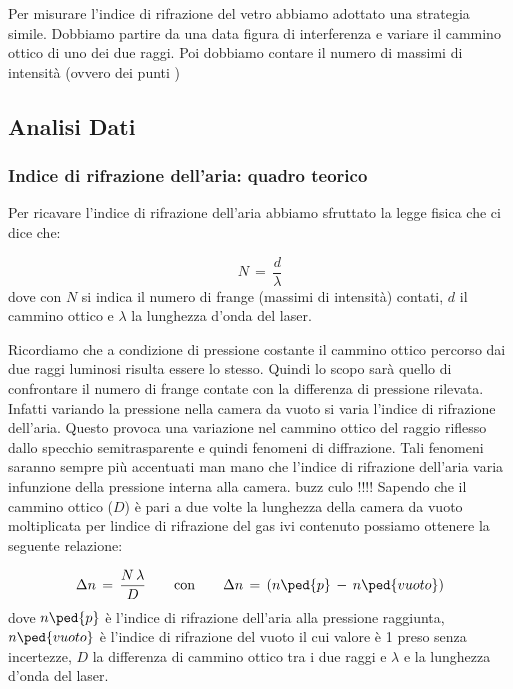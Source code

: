 Per misurare l'indice di rifrazione del vetro abbiamo adottato una strategia simile. Dobbiamo partire da una data figura di interferenza e variare il cammino ottico di uno dei due raggi. Poi dobbiamo contare il numero di massimi di intensità (ovvero dei punti )

\subsection{Analisi Dati}

\subsubsection{Indice di rifrazione dell'aria: quadro teorico}

Per ricavare l'indice di rifrazione dell'aria abbiamo sfruttato la legge fisica che ci dice che:

\begin{equation}
	N \,=\, \frac{d}{\lambda}
\end{equation}
%
dove con $N$  si indica il numero di frange (massimi di intensità) contati, $d$ il cammino ottico e $\lambda$ la lunghezza d'onda del laser.

Ricordiamo che a condizione di pressione costante il cammino ottico percorso dai due raggi luminosi risulta essere lo stesso.
Quindi lo scopo sarà quello di confrontare il numero di frange contate con la differenza di pressione rilevata. Infatti variando la pressione nella camera da vuoto si varia l'indice di rifrazione dell'aria. Questo provoca una variazione nel cammino ottico del raggio riflesso dallo specchio semitrasparente e quindi fenomeni di diffrazione. Tali fenomeni saranno sempre più accentuati man mano che l'indice di rifrazione dell'aria varia infunzione della pressione interna alla camera. buzz culo !!!!
Sapendo che il cammino ottico ($D$) è pari a due volte la lunghezza della camera da vuoto moltiplicata per lindice di rifrazione del gas ivi contenuto possiamo ottenere la seguente relazione:

\begin{equation}
	\Delta{n} \,=\, \frac{N \, \lambda}{D} \qquad \text{con} \qquad \Delta{n} \,=\, (n\ped{p} \,-\, n\ped{vuoto})
	\label{eq:delta_n}
\end{equation}
%
dove $n\ped{p}$ è l'indice di rifrazione dell'aria alla pressione raggiunta, $n\ped{vuoto}$ è l'indice di rifrazione del vuoto il cui valore è 1 preso senza incertezze, $D$ la differenza di cammino ottico tra i due raggi e $\lambda$ e la lunghezza d'onda del laser.

